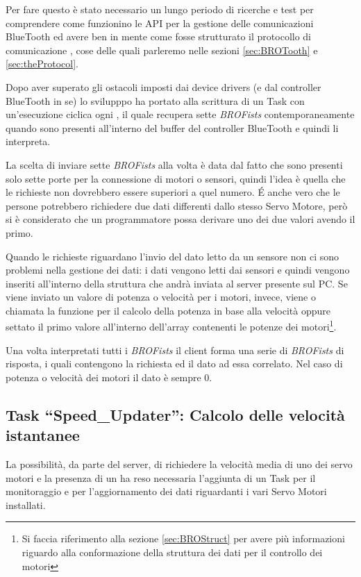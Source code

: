 Per fare questo è stato necessario un lungo periodo di ricerche e test per
comprendere come funzionino le API per la gestione delle comunicazioni
BlueTooth ed avere ben in mente come fosse strutturato il protocollo di
comunicazione \BROFist{}, cose delle quali parleremo nelle sezioni
\ref{sec:BROTooth} e \ref{sec:theProtocol}.

Dopo aver superato gli ostacoli imposti dai device drivers (e dal
controller BlueTooth in se) lo svilupppo ha portato alla scrittura di un
Task con un'esecuzione ciclica ogni , il quale recupera sette
\emph{BROFists} contemporaneamente quando sono presenti all'interno del
buffer del controller BlueTooth e quindi li interpreta.

La scelta di inviare sette \emph{BROFists} alla volta è data dal fatto che
sono presenti solo sette porte per la connessione di motori o sensori,
quindi l'idea è quella che le richieste non dovrebbero essere superiori a
quel numero. \'E anche vero che le persone potrebbero richiedere due dati
differenti dallo stesso Servo Motore, però si è considerato che un
programmatore possa derivare uno dei due valori avendo il primo.

Quando le richieste riguardano l'invio del dato letto da un sensore non ci
sono problemi nella gestione dei dati: i dati vengono letti dai sensori e
quindi vengono inseriti all'interno della struttura che andrà inviata al
server presente sul PC. Se viene inviato un valore di potenza o velocità
per i motori, invece, viene o chiamata la funzione per il calcolo della
potenza in base alla velocità oppure settato il primo valore all'interno
dell'array contenenti le potenze dei motori\footnote{Si faccia riferimento
alla sezione \ref{sec:BROStruct} per avere più informazioni riguardo alla
conformazione della struttura dei dati per il controllo dei motori}.

Una volta interpretati tutti i \emph{BROFists} il client forma una serie di
\emph{BROFists} di risposta, i quali contengono la richiesta ed il dato ad
essa correlato. Nel caso di potenza o velocità dei motori il dato è sempre
0.

\subsection[Task ``Speed\_Updater'']{Task ``Speed\_Updater'': Calcolo delle
velocità istantanee}\label{sec:BROSpdS}
La possibilità, da parte del server, di richiedere la velocità media di uno
dei servo motori e la presenza di un \PID{} ha reso necessaria l'aggiunta
di un Task per il monitoraggio e per l'aggiornamento dei dati riguardanti i
vari Servo Motori installati.

